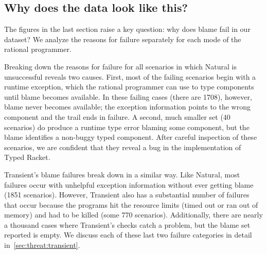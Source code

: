 

\subsection{Why does the data look like this?}

The figures in the last section raise a key question: why does blame fail in our dataset?
We analyze the reasons for failure separately for each mode of the rational programmer.

Breaking down the reasons for failure for all scenarios in which Natural is unsuccessful reveals two causes.
First, most of the failing scenarios begin with a runtime exception, which the rational programmer can use to type components until blame becomes available.
In these failing cases (there are 1708), however, blame never becomes available; the exception information points to the wrong component and the trail ends in failure.
A second, much smaller set (40 scenarios) do produce a runtime type error blaming some component, but the blame identifies a non-buggy typed component.
After careful inspection of these scenarios, we are confident that they reveal a bug in the implementation of Typed Racket.

Transient's blame failures break down in a similar way.
Like Natural, most failures occur with unhelpful exception information without ever getting blame (1851 scenarios).
However, Transient also has a substantial number of failures that occur because the programs hit the resource limits (timed out or ran out of memory) and had to be killed (some 770 scenarios).
Additionally, there are nearly a thousand cases where Transient's checks catch a problem, but the blame set reported is empty.
We discuss each of these last two failure categories in detail in~\ref{sec:threat:transient}.



